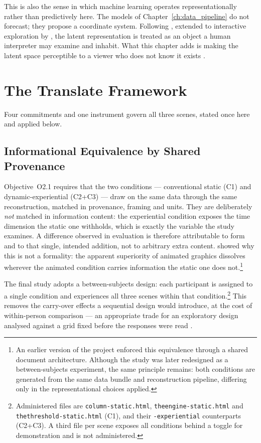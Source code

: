 This is also the sense in which machine learning operates representationally rather than predictively here. The models of Chapter~\ref{ch:data_pipeline} do not forecast; they propose a coordinate system. Following \textcite{iten2020}, extended to interactive exploration by \textcite{camps2019}, the latent representation is treated as an object a human interpreter may examine and inhabit. What this chapter adds is making the latent space perceptible to a viewer who does not know it exists \parencite{sacha2018}.

\section{The Translate Framework}
\label{sec:translate-framework}

Four commitments and one instrument govern all three scenes, stated once here and applied below.

\subsection{Informational Equivalence by Shared Provenance}
\label{subsec:equivalence}

Objective~O2.1 requires that the two conditions --- conventional static (C1) and dynamic-experiential (C2+C3) --- draw on the same data through the same reconstruction, matched in provenance, framing and units. They are deliberately \emph{not} matched in information content: the experiential condition exposes the time dimension the static one withholds, which is exactly the variable the study examines. A difference observed in evaluation is therefore attributable to form and to that single, intended addition, not to arbitrary extra content. \textcite{tversky2002} showed why this is not a formality: the apparent superiority of animated graphics dissolves wherever the animated condition carries information the static one does not.\footnote{An earlier version of the project enforced this equivalence through a shared document architecture. Although the study was later redesigned as a between-subjects experiment, the same principle remains: both conditions are generated from the same data bundle and reconstruction pipeline, differing only in the representational choices applied.}

The final study adopts a between-subjects design: each participant is assigned to a single condition and experiences all three scenes within that condition.\footnote{Administered files are \texttt{column-static.html}, \texttt{theengine-static.html} and \texttt{thethreshold-static.html} (C1), and their \texttt{-experiential} counterparts (C2+C3). A third file per scene exposes all conditions behind a toggle for demonstration and is not administered.} This removes the carry-over effects a sequential design would introduce, at the cost of within-person comparison --- an appropriate trade for an exploratory design analysed against a grid fixed before the responses were read \parencite{braunclarke2019}.

